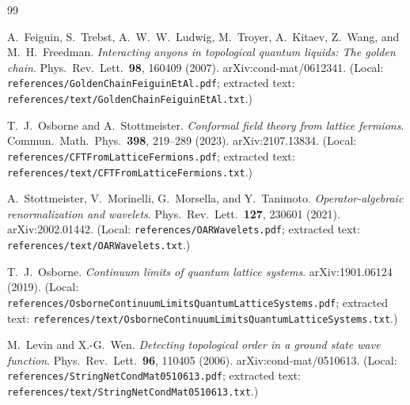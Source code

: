 \documentclass[11pt,a4paper]{article}
\theoremstyle{definition}
\begin{document}
\begin{thebibliography}{99}

A.~Feiguin, S.~Trebst, A.~W.~W.~Ludwig, M.~Troyer, A.~Kitaev, Z.~Wang, and
M.~H.~Freedman. \emph{Interacting anyons in topological quantum liquids:
The golden chain}. Phys.\ Rev.\ Lett.\ \textbf{98}, 160409 (2007).
arXiv:cond-mat/0612341. (Local: \texttt{references/GoldenChainFeiguinEtAl.pdf};
extracted text: \texttt{references/text/GoldenChainFeiguinEtAl.txt}.)

T.~J.~Osborne and A.~Stottmeister. \emph{Conformal field theory from lattice
fermions}. Commun.\ Math.\ Phys.\ \textbf{398}, 219--289 (2023).
arXiv:2107.13834. (Local: \texttt{references/CFTFromLatticeFermions.pdf};
extracted text: \texttt{references/text/CFTFromLatticeFermions.txt}.)

A.~Stottmeister, V.~Morinelli, G.~Morsella, and Y.~Tanimoto.
\emph{Operator-algebraic renormalization and wavelets}.
Phys.\ Rev.\ Lett.\ \textbf{127}, 230601 (2021). arXiv:2002.01442.
(Local: \texttt{references/OARWavelets.pdf};
extracted text: \texttt{references/text/OARWavelets.txt}.)

T.~J.~Osborne. \emph{Continuum limits of quantum lattice systems}.
arXiv:1901.06124 (2019).
(Local: \texttt{references/OsborneContinuumLimitsQuantumLatticeSystems.pdf};
extracted text: \texttt{references/text/OsborneContinuumLimitsQuantumLatticeSystems.txt}.)

M.~Levin and X.-G.~Wen. \emph{Detecting topological order in a ground state
wave function}. Phys.\ Rev.\ Lett.\ \textbf{96}, 110405 (2006).
arXiv:cond-mat/0510613. (Local: \texttt{references/StringNetCondMat0510613.pdf};
extracted text: \texttt{references/text/StringNetCondMat0510613.txt}.)

\end{thebibliography}
\end{document}

